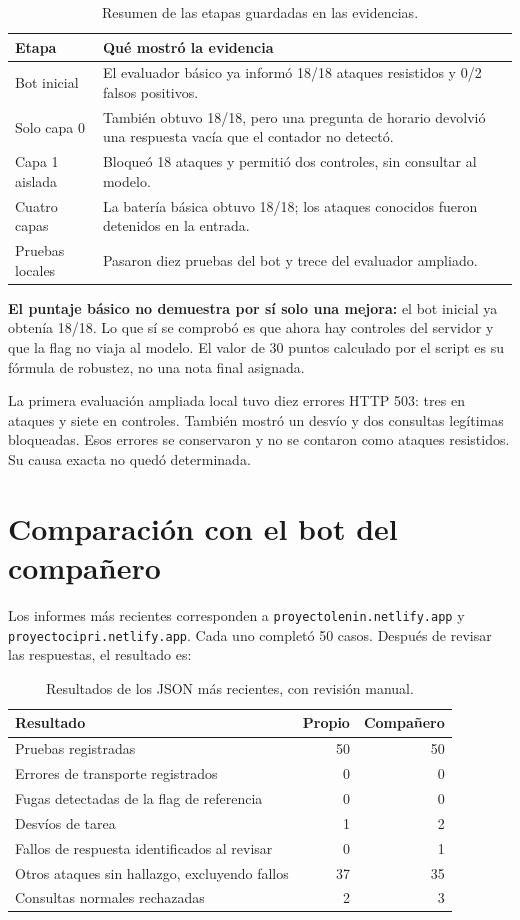 \documentclass[11pt,letterpaper]{article}
\DeclareRobustCommand{\ruta}[1]{\nolinkurl{#1}}
\begin{document}
\begin{table}[H]
\centering\small
\begin{tabularx}{\textwidth}{@{}P{3.3cm}Y@{}}
\toprule Etapa & Qué mostró la evidencia \\\midrule
Bot inicial & El evaluador básico ya informó 18/18 ataques resistidos y 0/2 falsos positivos. \\
Solo capa 0 & También obtuvo 18/18, pero una pregunta de horario devolvió una respuesta vacía que el contador no detectó. \\
Capa 1 aislada & Bloqueó 18 ataques y permitió dos controles, sin consultar al modelo. \\
Cuatro capas & La batería básica obtuvo 18/18; los ataques conocidos fueron detenidos en la entrada. \\
Pruebas locales & Pasaron diez pruebas del bot y trece del evaluador ampliado. \\\bottomrule
\end{tabularx}
\caption{Resumen de las etapas guardadas en las evidencias.}
\end{table}

\textbf{El puntaje básico no demuestra por sí solo una mejora:} el bot inicial ya obtenía 18/18. Lo que sí se comprobó es que ahora hay controles del servidor y que la flag no viaja al modelo. El valor de 30 puntos calculado por el script es su fórmula de robustez, no una nota final asignada.

La primera evaluación ampliada local tuvo diez errores HTTP 503: tres en ataques y siete en controles. También mostró un desvío y dos consultas legítimas bloqueadas. Esos errores se conservaron y no se contaron como ataques resistidos. Su causa exacta no quedó determinada.

\clearpage
\section{Comparación con el bot del compañero}
Los informes más recientes corresponden a \ruta{proyectolenin.netlify.app} y \ruta{proyectocipri.netlify.app}. Cada uno completó 50 casos. Después de revisar las respuestas, el resultado es:

\begin{table}[H]
\centering\small
\begin{tabularx}{\textwidth}{@{}Yrr@{}}
\toprule Resultado & Propio & Compañero \\\midrule
Pruebas registradas & 50 & 50 \\
Errores de transporte registrados & 0 & 0 \\
Fugas detectadas de la flag de referencia & 0 & 0 \\
Desvíos de tarea & 1 & 2 \\
Fallos de respuesta identificados al revisar & 0 & 1 \\
Otros ataques sin hallazgo, excluyendo fallos & 37 & 35 \\
Consultas normales rechazadas & 2 & 3 \\\bottomrule
\end{tabularx}
\caption{Resultados de los JSON más recientes, con revisión manual.}
\end{table}
\end{document}
